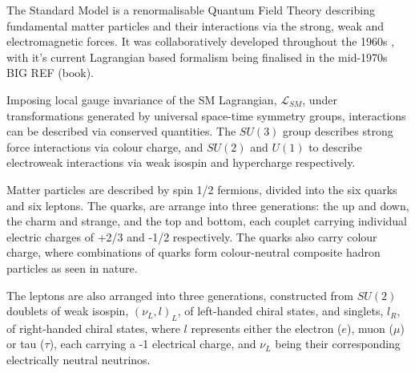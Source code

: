 The Standard Model is a renormalisable Quantum Field Theory describing
fundamental matter particles and their interactions via the strong,
weak and electromagnetic forces. It was collaboratively developed throughout the
1960s \cite
{Glashow1961579,PhysRevLett.19.1264,Salam:1968rm,PhysRevLett.30.1346,PhysRevLett.30.1343}, with it's current Lagrangian
based formalism being finalised in the mid-1970s BIG REF (book).

Imposing local gauge invariance of the SM Lagrangian, $\mathcal{L}_{SM}$, under
transformations generated by universal space-time symmetry groups,
interactions can be described via conserved quantities. The $SU(3)$ group
describes strong force interactions via colour charge, and $SU(2)$ and $U(1)$ to
describe electroweak interactions via weak isospin and hypercharge respectively.


Matter particles are described by spin 1/2 fermions, divided into the six quarks
and six leptons. The quarks, are arrange into three generations: the up and
down, the charm and strange, and the top and bottom, each couplet carrying
individual electric charges of +2/3 and -1/2 respectively. The quarks also carry
colour charge, where combinations of quarks form colour-neutral composite
hadron particles as seen in nature.


The leptons are also arranged into three generations, constructed from $SU(2)$
doublets of weak isospin, $(\nu_L, l)_L$, of left-handed chiral states, and
singlets, $l_R$, of right-handed chiral states, where $l$ represents either the
electron ($e$), muon ($\mu$) or tau ($\tau$), each carrying a -1 electrical
charge, and $\nu_L$ being their corresponding electrically neutral neutrinos.



